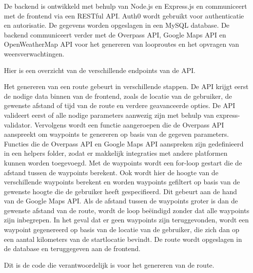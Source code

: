     De backend is ontwikkeld met behulp van Node.js en Express.js en communiceert met de frontend via een RESTful API. 
    Auth0 wordt gebruikt voor authenticatie en autorisatie. De gegevens worden opgeslagen in een MySQL database. 
    De backend communiceert verder met de Overpass API, Google Maps API en OpenWeatherMap API voor het genereren van looproutes en het opvragen van weersverwachtingen.
    
    Hier is een overzicht van de verschillende endpoints van de API.
    
    Het genereren van een route gebeurt in verschillende stappen. 
    De API krijgt eerst de nodige data binnen van de frontend, zoals de locatie van de gebruiker, de gewenste afstand of tijd van de route en verdere geavanceerde opties. 
    De API valideert eerst of alle nodige parameters aanwezig zijn met behulp van express-validator. 
    Vervolgens wordt een functie aangeroepen die de Overpass API aanspreekt om waypoints te genereren op basis van de gegeven parameters. 
    Functies die de Overpass API en Google Maps API aanspreken zijn gedefinieerd in een helpers folder, zodat er makkelijk integraties met andere platformen kunnen worden toegevoegd. 
    Met de waypoints wordt een for-loop gestart die de afstand tussen de waypoints berekent. Ook wordt hier de hoogte van de verschillende waypoints berekent en worden waypoints gefiltert 
    op basis van de gewenste hoogte die de gebruiker heeft gespecifieerd. Dit gebeurt aan de hand van de Google Maps API.
    Als de afstand tussen de waypoints groter is dan de gewenste afstand van de route,
    wordt de loop beëindigd zonder dat alle waypoints zijn inbegrepen. 
    In het geval dat er geen waypoints zijn teruggevonden, wordt een waypoint gegenereerd op basis van de locatie van de gebruiker, die zich dan op een aantal kilometers van de startlocatie bevindt. 
    De route wordt opgeslagen in de database en teruggegeven aan de frontend.

    \pagebreak

Dit is de code die verantwoordelijk is voor het genereren van de route.

